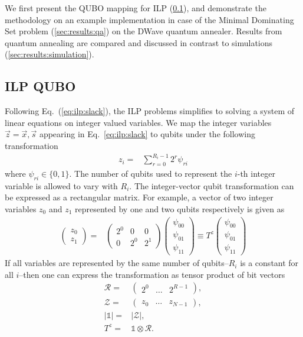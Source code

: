 \documentclass[prd,twocolumn,tightenlines,preprintnumbers,showpacs,superscriptaddress,notitlepage,nofootinbib,eqsecnum,floatfix,longbibliography,aps,10pt]{revtex4-2}
\begin{document}
We first present the QUBO mapping for ILP (\ref{sec:results:qa1}), and demonstrate the methodology on an example implementation in case of the Minimal Dominating Set problem (\ref{sec:results:qa}) on the DWave quantum annealer. Results from quantum annealing are compared and discussed in contrast to simulations (\ref{sec:results:simulation}).

\subsection{ILP QUBO}
\label{sec:results:qa1}
Following Eq.~(\ref{eq:ilp:slack}), the ILP problems simplifies to solving a system of linear equations on integer valued variables. We map the integer variables $\vec z = \vec x, \vec s$ appearing in Eq.~\eqref{eq:ilp:slack} to qubits under the following transformation~\cite{Chang:2018uoc}
\begin{align}
 z_i = & \sum_{r=0}^{R_i-1} 2^r \psi_{ri}
 \label{eq:int_to_bin}
\end{align}
where $\psi_{ri} \in \{0, 1\}$. The number of qubits used to represent the $i$-th integer variable is allowed to vary with $R_i$.
The integer-vector qubit transformation can be expressed as a rectangular matrix.
For example, a vector of two integer variables $z_0$ and $z_1$ represented by one and two qubits respectively is given as
\begin{align}
 \begin{pmatrix}
  z_0 \\
  z_1
 \end{pmatrix}
 = &
 \begin{pmatrix}
  2^0 & 0   & 0   \\
  0   & 2^0 & 2^1
 \end{pmatrix}
 \begin{pmatrix}
  \psi_{00} \\
  \psi_{01} \\
  \psi_{11}
 \end{pmatrix}
 \equiv T^z \begin{pmatrix}
  \psi_{00} \\
  \psi_{01} \\
  \psi_{11}
 \end{pmatrix}
\end{align}
If all variables are represented by the same number of qubits--$R_i$ is a constant for all $i$--then one can express the transformation as tensor product of bit vectors
\begin{align}
 \mathcal{R} =  & \begin{pmatrix} 2^0 & \dots & 2^{R-1}\end{pmatrix},    \\
 \mathcal{Z} =  & \begin{pmatrix} z_0 & \dots & z_{N-1}\end{pmatrix},    \\
 |\mathds{1}| = & |\mathcal{Z}|,                 \\
 T^z =          & \mathds{1}\otimes \mathcal{R}.
\end{align}
\end{document}
